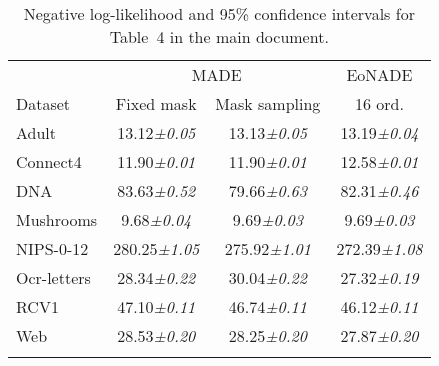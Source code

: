 \documentclass{article}
\begin{document}
 


\newcommand{\tpm}[1]{\textit{\tiny{±#1}}}

\begin{table}
\caption{Negative log-likelihood and 95\% confidence intervals for Table~4 in the main document.}
\begin{center} 
\begin{tabular}{lccc}\toprule
& \multicolumn{2}{c}{MADE}                        & EoNADE \\
\cmidrule[.5pt]{2-3}
Dataset     & Fixed mask       &  Mask sampling   & 16 ord.\\
\midrule
Adult       &  13.12\tpm{0.05} &  13.13\tpm{0.05} &  13.19\tpm{0.04}\\
Connect4    &  11.90\tpm{0.01} &  11.90\tpm{0.01} &  12.58\tpm{0.01}\\
DNA         &  83.63\tpm{0.52} &  79.66\tpm{0.63} &  82.31\tpm{0.46}\\
Mushrooms   &   9.68\tpm{0.04} &   9.69\tpm{0.03} &   9.69\tpm{0.03}\\
NIPS-0-12   & 280.25\tpm{1.05} & 275.92\tpm{1.01} & 272.39\tpm{1.08}\\
Ocr-letters &  28.34\tpm{0.22} &  30.04\tpm{0.22} &  27.32\tpm{0.19}\\
RCV1        &  47.10\tpm{0.11} &  46.74\tpm{0.11} &  46.12\tpm{0.11}\\
Web         &  28.53\tpm{0.20} &  28.25\tpm{0.20} &  27.87\tpm{0.20}\\
\bottomrule
\label{tab:results_confidence_intervals}
\end{tabular}
\end{center} 
\end{table}
\end{document}
